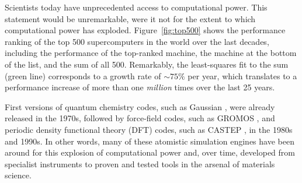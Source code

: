 \documentclass[9pt,review]{livecoms}
\begin{document}
Scientists today have unprecedented access to computational power.
This statement would be unremarkable, were it not for the extent to which computational power has exploded.
Figure~\ref{fig:top500} shows the performance ranking of the top 500 supercomputers in the world over the last decades, including the performance of the top-ranked machine, the machine at the bottom of the list, and the sum of all 500.
Remarkably, the least-squares fit to the sum (green line) corresponds to a growth rate of ${\sim}75\%$ per year, which translates to a performance increase of more than one \emph{million} times over the last 25 years.

First versions of quantum chemistry codes, such as Gaussian \cite{Hehre1970}, 
were already released in the 1970s,
followed by force-field codes, such as GROMOS \cite{VANGUNSTEREN1982}, 
and periodic density functional theory (DFT) codes, such as CASTEP \cite{Payne1992a}, in the 1980s and 1990s.
In other words, many of these atomistic simulation engines have been around for this explosion of computational power and, over time, developed from specialist instruments to proven and tested tools in the arsenal of materials science.
\end{document}
